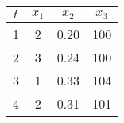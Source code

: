\documentclass[border=1mm, preview]{standalone}
\begin{document}
\begin{tabular}{c|c|c|c}
\hline
$t$ &  $x_1$  &  $x_2$  &  $x_3$ \\
\hline
1 & 2 & 0.20 & 100\\
\hline
2 & 3 & 0.24 & 100\\
\hline
3 & 1 & 0.33 & 104\\
\hline
4 & 2 & 0.31 & 101\\
\hline
\end{tabular}
\end{document}
